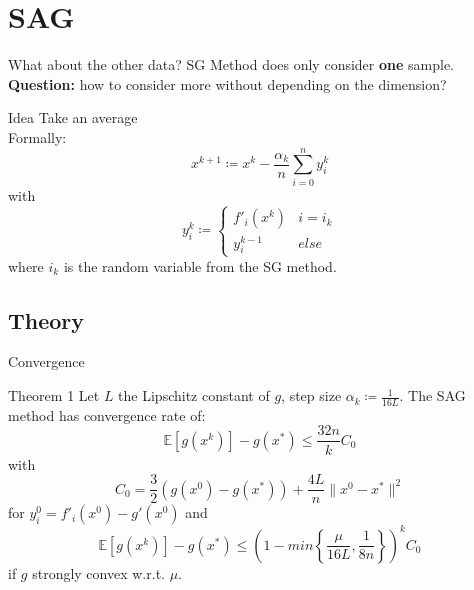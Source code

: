 \documentclass{beamer}
\numberwithin{equation}{aufgabe}
\begin{document}
\section{SAG}
\begin{frame}{What about the other data?}
    SG Method does only consider \textbf{one} sample.\\
    \textbf{Question:} how to consider more without depending on the dimension?
    \pause
    \begin{exampleblock}{Idea}
        Take an average\\
        \pause
        Formally:
        $$x^{k+1} \coloneqq x^k - \frac{\alpha_k}{n}\sum_{i=0}^n y_i^k$$
        with
        \pause
        $$y_i^k \coloneqq \begin{cases}
            f'_i(x^k) & i = i_k\\
            y_i^{k-1} & else
        \end{cases}$$
        where $i_k$ is the random variable from the SG method.
    \end{exampleblock}
\end{frame}

\subsection{Theory}
\begin{frame}{Convergence}
    \begin{block}{Theorem 1}
        Let $L$ the Lipschitz constant of $g$, step size $\alpha_k \coloneqq\frac{1}{16L}$. The SAG method has convergence rate of:
        \pause
        $$\mathbb{E}[g(x^k)] - g(x^*) \leq \frac{32n}{k}C_0$$
        with \pause
        $$C_0 = \frac{3}{2} \left( g(x^0) - g(x^*) \right) + \frac{4L}{n}\| x^0 - x^* \|^2$$
        for $y_i^0=f'_i(x^0)-g'(x^0)$ and \pause
        $$\mathbb{E}[g(x^k)] - g(x^*) \leq \left( 1-min\left\{ \frac{\mu}{16L}, \frac{1}{8n} \right\} \right)^kC_0$$
        if $g$ strongly convex w.r.t. $\mu$.
    \end{block}
\end{frame}
\end{document}
